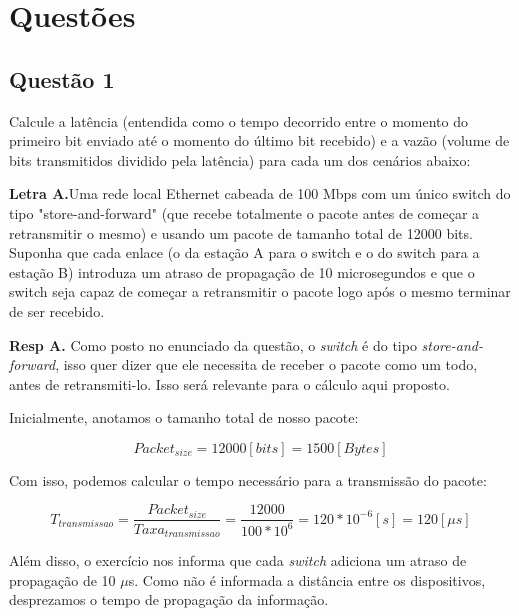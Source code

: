 \section{Questões}\label{sec:questoes}


\subsection{Questão 1}

Calcule a latência (entendida como o tempo decorrido entre o momento do primeiro
bit enviado até o momento do último bit recebido) e a vazão (volume de bits
transmitidos dividido pela latência) para cada um dos cenários abaixo:
\newline


    \textbf{Letra A.}Uma rede local Ethernet cabeada de 100 Mbps com um único switch do tipo
    "store-and-forward" (que recebe totalmente o pacote antes de começar a
    retransmitir o mesmo) e usando um pacote de tamanho total de 12000 bits. Suponha
    que cada enlace (o da estação A para o switch e o do switch para a estação B)
    introduza um atraso de propagação de 10 microsegundos e que o switch seja capaz
    de começar a retransmitir o pacote logo após o mesmo terminar de ser recebido.
    \newline

\textbf{Resp A.} Como posto no enunciado da questão, o \textit{switch} é do tipo \textit{store-and-forward}, isso quer dizer que ele necessita de receber o pacote como um todo, antes de retransmiti-lo. Isso será relevante para o cálculo aqui proposto.

Inicialmente, anotamos o tamanho total de nosso pacote:

\begin{equation}
	Packet_{size} = 12000 [bits] = 1500 [Bytes]
\end{equation}

Com isso, podemos calcular o tempo necessário para a transmissão do pacote:

\begin{equation}
	T_{transmissao} = \frac{Packet_{size}}{Taxa_{transmissao}} = \frac{12000}{100 * 10^6} = 120*10^{-6} [s] = 120 [\mu s]	
\end{equation}	

Além disso, o exercício nos informa que cada \textit{switch} adiciona um atraso de propagação de 10 $\mu$s. Como não é informada a distância entre os dispositivos, desprezamos o tempo de propagação da informação.

